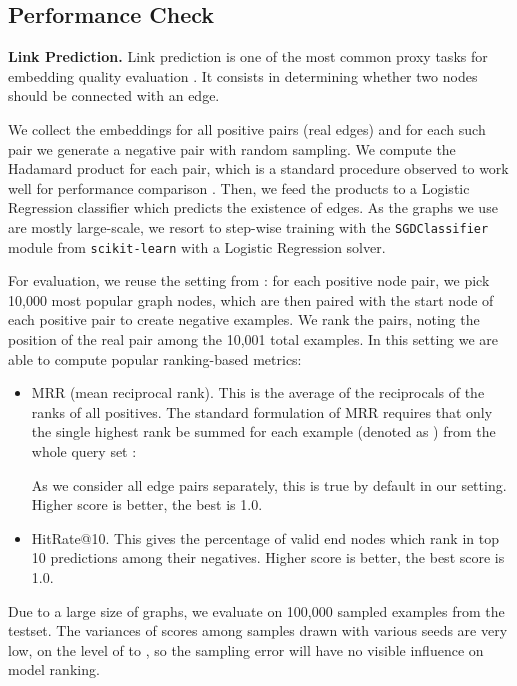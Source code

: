 \documentclass{IEEEtran}
\begin{document}
\subsection{Performance Check}
\textbf{Link Prediction.}
Link prediction is one of the most common proxy tasks for embedding quality evaluation \cite{liben2007link}. It consists in determining whether two nodes should be connected with an edge. 



 We collect the embeddings for all positive pairs (real edges) and for each such pair we generate a negative pair with random sampling. We compute the Hadamard product for each pair, which is a standard procedure observed to work well for performance comparison \cite{grover2016node2vec, 10.1145/3184558.3191523}. Then, we feed the products to a Logistic Regression classifier which predicts the existence of edges. As the graphs we use are mostly large-scale, we resort to step-wise training with the \texttt{SGDClassifier} module from \texttt{scikit-learn} with a Logistic Regression solver.
 
 For evaluation, we reuse the setting from \cite{pbg}: for each positive  node pair, we pick 10,000 most popular graph nodes, which are then paired with the start node of each positive pair to create negative examples. We rank the pairs, noting the position of the real pair among the 10,001 total examples. In this setting we are able to compute popular ranking-based metrics:
\begin{itemize}
    \item MRR (mean reciprocal rank). This is the average of the reciprocals of the ranks of all positives. The standard formulation of MRR requires that only the single highest rank be summed for each example  (denoted as ) from the whole query set :

         

    As we consider all edge pairs separately, this is true by default in our setting. Higher score is better, the best is 1.0.
    
    \item HitRate@10. This gives the percentage of valid end nodes which rank in top 10 predictions among their negatives. Higher score is better, the best score is 1.0.
\end{itemize}

Due to a large size of graphs, we evaluate on 100,000 sampled examples from the testset. The variances of scores among  samples drawn with various seeds are very low, on the level of  to , so the sampling error will have no visible influence on model ranking.
\end{document}
